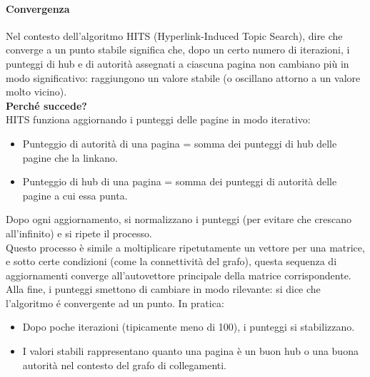 \paragraph{Convergenza} Nel contesto dell’algoritmo HITS (Hyperlink-Induced Topic Search), dire che converge a un punto stabile significa che, dopo un certo numero di iterazioni, i punteggi di hub e di autorità assegnati a ciascuna pagina non cambiano più in modo significativo: raggiungono un valore stabile (o oscillano attorno a un valore molto vicino).
\\
\textbf{Perché succede?}
\\
HITS funziona aggiornando i punteggi delle pagine in modo iterativo:
\begin{itemize}
    \item Punteggio di autorità di una pagina = somma dei punteggi di hub delle pagine che la linkano.
    \item Punteggio di hub di una pagina = somma dei punteggi di autorità delle pagine a cui essa punta.
\end{itemize}
Dopo ogni aggiornamento, si normalizzano i punteggi (per evitare che crescano all’infinito) e si ripete il processo.
\\
Questo processo è simile a moltiplicare ripetutamente un vettore per una matrice, e sotto certe condizioni (come la connettività del grafo), questa sequenza di aggiornamenti converge all’autovettore principale della matrice corrispondente. Alla fine, i punteggi smettono di cambiare in modo rilevante: si dice che l’algoritmo é convergente ad un punto.
In pratica:
\begin{itemize}
    \item Dopo poche iterazioni (tipicamente meno di 100), i punteggi si stabilizzano.
    \item I valori stabili rappresentano quanto una pagina è un buon hub o una buona autorità nel contesto del grafo di collegamenti.
\end{itemize}

